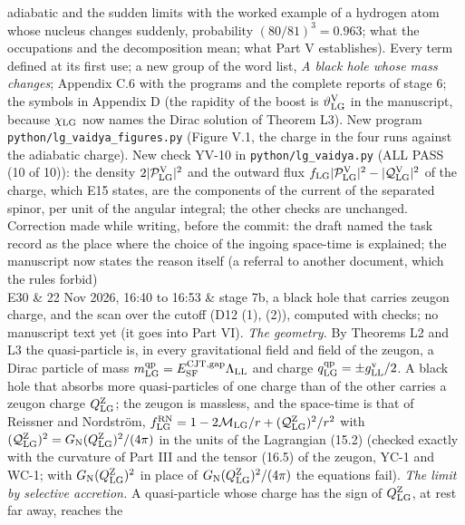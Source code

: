 \documentclass[
  10pt,
]{article}
\begin{document}
\begin{longtable}[]
adiabatic and the sudden limits with the worked example of a hydrogen
atom whose nucleus changes suddenly, probability \((80/81)^3=0.963\);
what the occupations and the decomposition mean; what Part V
establishes). Every term defined at its first use; a new group of the
word list, \emph{A black hole whose mass changes}; Appendix C.6 with the
programs and the complete reports of stage 6; the symbols in Appendix D
(the rapidity of the boost is \(\vartheta^{\rm V}_{\rm LG}\) in the
manuscript, because \(\chi_{\rm LG}\) now names the Dirac solution of
Theorem L3). New program \texttt{python/lg\_vaidya\_figures.py} (Figure
V.1, the charge in the four runs against the adiabatic charge). New
check YV-10 in \texttt{python/lg\_vaidya.py} (ALL PASS (10 of 10)): the
density \(2\lvert\mathcal P^{\rm V}_{\rm LG}\rvert^2\) and the outward
flux
\(f_{\rm LG}\lvert\mathcal P^{\rm V}_{\rm LG}\rvert^2-\lvert\mathcal Q^{\rm V}_{\rm LG}\rvert^2\)
of the charge, which E15 states, are the components of the current of
the separated spinor, per unit of the angular integral; the other checks
are unchanged. Correction made while writing, before the commit: the
draft named the task record as the place where the choice of the ingoing
space-time is explained; the manuscript now states the reason itself (a
referral to another document, which the rules forbid) \\
E30 & 22 Nov 2026, 16:40 to 16:53 & stage 7b, a black hole that carries
zeugon charge, and the scan over the cutoff (D12 (1), (2)), computed
with checks; no manuscript text yet (it goes into Part VI). \emph{The
geometry.} By Theorems L2 and L3 the quasi-particle is, in every
gravitational field and field of the zeugon, a Dirac particle of mass
\(m^{\rm qp}_{\rm LG}=E^{\rm CJT,gap}_{\rm SF}\Lambda_{\rm LL}\) and
charge \(q^{\rm qp}_{\rm LG}=\pm g^{\rm v}_{\rm LL}/2\). A black hole
that absorbs more quasi-particles of one charge than of the other
carries a zeugon charge \(Q^{\rm Z}_{\rm LG}\); the zeugon is massless,
and the space-time is that of Reissner and Nordström,
\(f^{\rm RN}_{\rm LG}=1-2\mathcal M_{\rm LG}/r+(\mathcal Q^{\rm Z}_{\rm LG})^2/r^2\)
with
\((\mathcal Q^{\rm Z}_{\rm LG})^2=G_{\rm N}(Q^{\rm Z}_{\rm LG})^2/(4\pi)\)
in the units of the Lagrangian (15.2) (checked exactly with the
curvature of Part III and the tensor (16.5) of the zeugon, YC-1 and
WC-1; with \(G_{\rm N}(Q^{\rm Z}_{\rm LG})^2\) in place of
\(G_{\rm N}(Q^{\rm Z}_{\rm LG})^2/(4\pi)\) the equations fail).
\emph{The limit by selective accretion.} A quasi-particle whose charge
has the sign of \(Q^{\rm Z}_{\rm LG}\), at rest far away, reaches the

\end{longtable}
\end{document}
